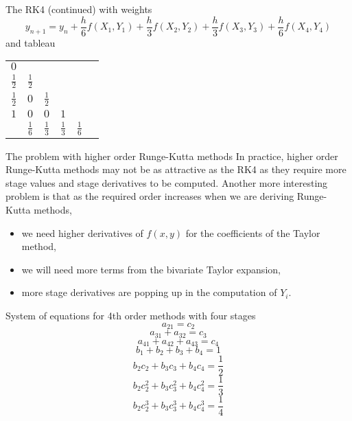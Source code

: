 \documentclass[12pt]{beamer}
\begin{document}
\begin{frame}{The RK4 (continued)}
  with weights
  $$y_{n+1} = y_n + \frac{h}{6}f(X_1,Y_1) + \frac{h}{3}f(X_2,Y_2) + 
  \frac{h}{3}f(X_3,Y_3) + \frac{h}{6}f(X_4,Y_4)$$
  \pause
  and tableau \newline

  \begin{table}
  \centering
  \renewcommand{\arraystretch}{1.25}
     \begin{tabular}{r | c*{4}{c}}
                        $0$ \\
        $\frac{1}{2}$ & $\frac{1}{2}$ \\
        $\frac{1}{2}$ &          $0$         & $\frac{1}{2}$ \\
                        $1$ &          $0$         &           $0$        & $1$ \\
                     \hline
    \phantom{c4}     & $\frac{1}{6}$ & $\frac{1}{3}$ & $\frac{1}{3}$ & $\frac{1}{6}$ \\
    \end{tabular}
  \renewcommand{\arraystretch}{1.0}
  \end{table}
\end{frame}

\begin{frame}{The problem with higher order Runge-Kutta methods}
  In practice, higher order Runge-Kutta methods may not be as attractive as the RK4 as they
  require more stage values and stage derivatives to be computed. \newline
  \newline
  \pause
  Another more interesting problem is that as the required order increases
  when we are deriving Runge-Kutta methods,
  \begin{itemize}
    \pause
    \item we need higher derivatives of $f(x,y)$ for the coefficients of the Taylor method,
    \pause
    \item we will need more terms from the bivariate Taylor expansion,
    \pause
    \item more stage derivatives are popping up in the computation of $Y_i$. 
  \end{itemize}
\end{frame}

\begin{frame}{System of equations for 4th order methods with four stages}
  $$a_{21} = c_2$$
  $$a_{31} + a_{32} = c_3$$
  $$a_{41} + a_{42} + a_{43} = c_4$$
  $$b_1 + b_2 + b_3 + b_4 = 1$$
  $$b_2c_2 + b_3c_3 + b_4c_4 = \frac{1}{2}$$
  $$b_2c_2^2 + b_3c_3^2 + b_4c_4^2 = \frac{1}{3}$$
  $$b_2c_2^3 + b_3c_3^3 + b_4c_4^3 = \frac{1}{4}$$
\end{frame}
\end{document}
